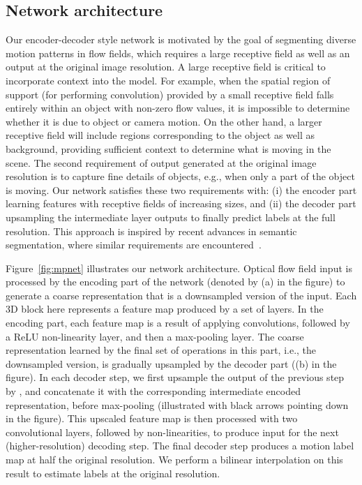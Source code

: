 \subsection{Network architecture}
\label{sec:net}
Our encoder-decoder style network is motivated by the goal of segmenting
diverse motion patterns in flow fields, which requires a large receptive field
as well as an output at the original image resolution. A large receptive field
is critical to incorporate context into the model. For example, when the
spatial region of support (for performing convolution) provided by a small
receptive field falls entirely within an object with non-zero flow values, it
is impossible to determine whether it is due to object or camera motion. On the
other hand, a larger receptive field will include regions corresponding to the
object as well as background, providing sufficient context to determine what is
moving in the scene. The second requirement of output generated at the original
image resolution is to capture fine details of objects, e.g., when only a part
of the object is moving. Our network satisfies these two requirements with: (i)
the encoder part learning features with receptive fields of increasing sizes,
and (ii) the decoder part upsampling the intermediate layer outputs to finally
predict labels at the full resolution. This approach is inspired by recent advances in semantic segmentation, where similar requirements are encountered~\cite{Ronneberger15}.

Figure~\ref{fig:mpnet} illustrates our network architecture. Optical flow
field input is processed by the encoding part of the network (denoted by (a) in
the figure) to generate a coarse representation that is a 
downsampled version of the input. Each 3D block here represents a feature map
produced by a set of layers. In the encoding part, each feature map is a result
of applying convolutions, followed by a ReLU non-linearity layer, and then a
 max-pooling layer. The coarse representation learned by the final set
of operations in this part, i.e., the  downsampled version, is
gradually upsampled by the decoder part ((b) in the figure). In each decoder
step, we first upsample the output of the previous step by , and
concatenate it with the corresponding intermediate encoded representation,
before max-pooling (illustrated with black arrows pointing down in the figure).
This upscaled feature map is then processed with two convolutional layers,
followed by non-linearities, to produce input for the next (higher-resolution)
decoding step. The final decoder step produces a motion label map at half the
original resolution. We perform a bilinear interpolation on this result to
estimate labels at the original resolution.


